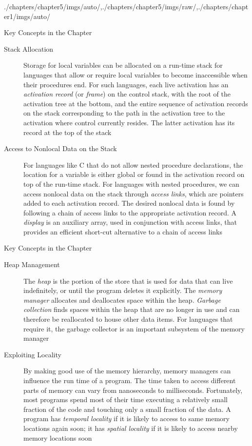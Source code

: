 \begin{graphicspathcontext}{{./chapters/chapter5/imgs/auto/},{./chapters/chapter5/imgs/raw/},{./chapters/chapter1/imgs/auto/}}
\begin{bibunit}[apalike]
\begin{frame}{{Key Concepts} in the Chapter \insertcontinuationtext}
	\begin{description}
		\item[Stack Allocation] Storage for local variables can be allocated on a run-time stack for languages that allow or require local variables to become inaccessible when their procedures end. For such languages, each live activation has an \emph{activation record} (or \emph{frame}) on the control stack, with the root of the activation tree at the bottom, and the entire sequence of activation records on the stack corresponding to the path in the activation tree to the activation where control currently resides. The latter activation has its record at the top of the stack
		\item[Access to Nonlocal Data on the Stack] For languages like C that do not allow nested procedure declarations, the location for a variable is either global or found in the activation record on top of the run-time stack. For languages with nested procedures, we can access nonlocal data on the stack through \emph{access links}, which are pointers added to each activation record. The desired nonlocal data is found by following a chain of access links to the appropriate activation record. A \emph{display} is an auxiliary array, used in conjunction with access links, that provides an efficient short-cut alternative to a chain of access links
	\end{description}
\end{frame}

\begin{frame}{{Key Concepts} in the Chapter \insertcontinuationtext}
	\begin{description}
		\item[Heap Management] The \emph{heap} is the portion of the store that is used for data that can live indefinitely, or until the program deletes it explicitly. The \emph{memory manager} allocates and deallocates space within the heap. \emph{Garbage collection} finds spaces within the heap that are no longer in use and can therefore be reallocated to house other data items. For languages that require it, the garbage collector is an important subsystem of the memory manager
		\item[Exploiting Locality] By making good use of the memory hierarchy, memory managers can influence the run time of a program. The time taken to access different parts of memory can vary from nanoseconds to milliseconds. Fortunately, most programs spend most of their time executing a relatively small fraction of the code and touching only a small fraction of the data. A program has \emph{temporal locality} if it is likely to access to same memory locations again soon; it has \emph{spatial locality} if it is likely to access nearby memory locations soon
	\end{description}
\end{frame}


\end{bibunit}
\end{graphicspathcontext}
